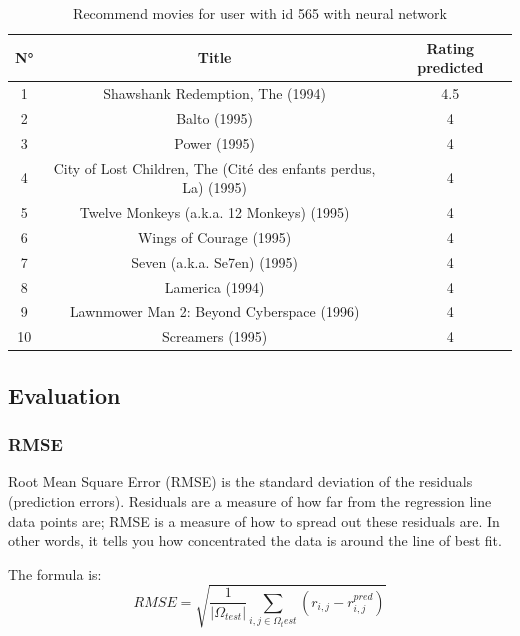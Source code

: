 \documentclass{article}
\begin{document}
\begin{table}[h]
      \centering
      \begin{tabular}{c|c|c}
          \hline
      \rowcolor{lightgray}N° & Title & Rating predicted\\ 
          \hline
          1 & Shawshank Redemption, The (1994) & 4.5\\
          \hline
          2 & Balto (1995) & 4\\
          \hline
          3 & Power (1995) & 4\\
          \hline
          4 & City of Lost Children, The (Cité des enfants perdus, La) (1995) & 4\\
          \hline
          5 & Twelve Monkeys (a.k.a. 12 Monkeys) (1995) & 4\\
          \hline
          6 & Wings of Courage (1995) & 4\\
          \hline
          7 & Seven (a.k.a. Se7en) (1995) & 4\\
          \hline
          8 & Lamerica (1994) & 4\\
          \hline
          9 & Lawnmower Man 2: Beyond Cyberspace (1996) & 4\\
          \hline
          10 & Screamers (1995) & 4\\
          \hline
      \end{tabular}
      \caption{Recommend movies for user with id 565 with neural network}
      \label{tab:recommendedMovie2}
  \end{table}

\subsection{Evaluation}

\subsubsection{RMSE}

Root Mean Square Error (RMSE) is the standard deviation of the residuals (prediction errors). Residuals are a measure of how far from the regression line data points are; RMSE is a measure of how to spread out these residuals are. In other words, it tells you how concentrated the data is around the line of best fit. 

The formula is:
\begin{equation}
      RMSE = \sqrt{\frac{1}{|\Omega_{test}|}\sum_{i,j\in\Omega_test} (r_{i,j} - r_{i,j}^{pred})}
\end{equation}
\end{document}
